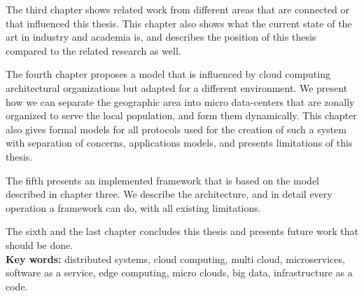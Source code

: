 The third chapter shows related work from different areas that are connected or that influenced this thesis. This chapter also shows what the current state of the art in industry and academia is, and describes the position of this thesis compared to the related research as well.

The fourth chapter proposes a model that is influenced by cloud computing architectural organizations but adapted for a different environment. We present how we can separate the geographic area into micro data-centers that are zonally organized to serve the local population, and form them dynamically. This chapter also gives formal models for all protocols used for the creation of such a system with separation of concerns, applications models, and presents limitations of this thesis.

The fifth presents an implemented framework that is based on the model described in chapter three. We describe the architecture, and in detail every operation a framework can do, with all existing limitations.

The sixth and the last chapter concludes this thesis and presents future work that should be done.\\ 

\noindent
\textbf{Key words:} distributed systems, cloud computing, multi cloud, microservices, software as a service, edge computing, micro clouds, big data, infrastructure as a code.